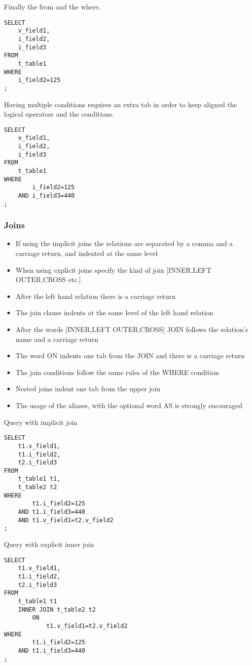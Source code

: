 Finally the from and the where.

\begin{lstlisting}[style=pgsql]
SELECT 
	v_field1,
	i_field2,
	i_field3 
FROM 
	t_table1 
WHERE 
	i_field2=125
;
\end{lstlisting}


Having multiple conditions requires an extra tab in order to keep aligned the logical operators and the 
conditions.

\begin{lstlisting}[style=pgsql]
SELECT 
	v_field1,
	i_field2,
	i_field3 
FROM 
	t_table1 
WHERE 
		i_field2=125
	AND	i_field3=440
;
\end{lstlisting}


\subsubsection{Joins}

\begin{itemize}
 \item If using the implicit joins the relations are separated by a comma and a carriage return, and indented at 
the same level
 \item When using explicit joins specify the kind of join [INNER,LEFT OUTER,CROSS etc.] 
 \item After the left hand relation there is a carriage return
 \item The join clause indents at the same level of the left hand relation
 \item After the words [INNER,LEFT OUTER,CROSS] JOIN follows the relation's name and a carriage return
 \item The word ON indents one tab from the JOIN and there is a carriage return
 \item The join conditions follow the same rules of the WHERE condition
 \item Nested joins indent one tab from the upper join
 \item The usage of the aliases, with the optional word AS is strongly encouraged
 \end{itemize}
\pagebreak
Query with implicit join
\begin{lstlisting}[style=pgsql]
SELECT 
	t1.v_field1,
	t1.i_field2,
	t2.i_field3 
FROM 
	t_table1 t1,
	t_table2 t2
WHERE 
		t1.i_field2=125
	AND	t1.i_field3=440
	AND	t1.v_field1=t2.v_field2
;
\end{lstlisting}


Query with explicit inner join
\begin{lstlisting}[style=pgsql]
SELECT 
	t1.v_field1,
	t1.i_field2,
	t2.i_field3 
FROM 
	t_table1 t1 
	INNER JOIN t_table2 t2
		ON
			t1.v_field1=t2.v_field2
WHERE 
		t1.i_field2=125
	AND	t1.i_field3=440
;
\end{lstlisting}

